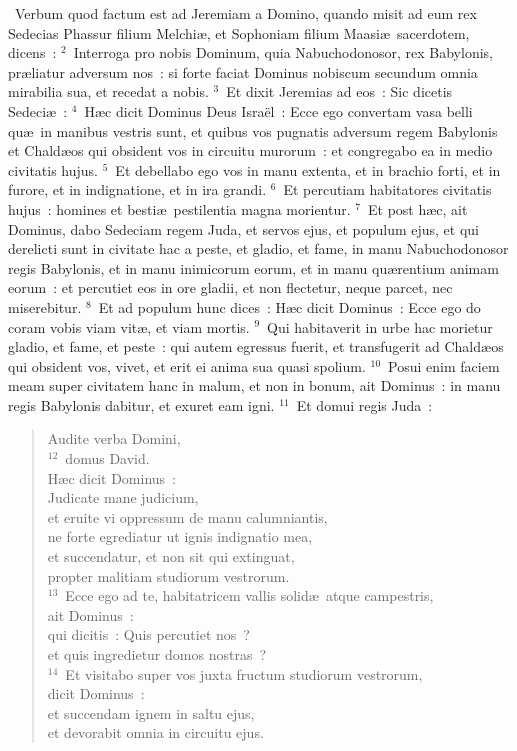~Verbum quod factum est ad Jeremiam a Domino, quando misit ad eum rex Sedecias Phassur filium Melchi\ae , et Sophoniam filium Maasi\ae\ sacerdotem, dicens~:
${}^{2}$~Interroga pro nobis Dominum, quia Nabuchodonosor, rex Babylonis, pr\ae liatur adversum nos~: si forte faciat Dominus nobiscum secundum omnia mirabilia sua, et recedat a nobis.
${}^{3}$~Et dixit Jeremias ad eos~: Sic dicetis Sedeci\ae~:
${}^{4}$~H\ae c dicit Dominus Deus Isra\"el~: Ecce ego convertam vasa belli qu\ae\ in manibus vestris sunt, et quibus vos pugnatis adversum regem Babylonis et Chald\ae os qui obsident vos in circuitu murorum~: et congregabo ea in medio civitatis hujus.
${}^{5}$~Et debellabo ego vos in manu extenta, et in brachio forti, et in furore, et in indignatione, et in ira grandi.
${}^{6}$~Et percutiam habitatores civitatis hujus~: homines et besti\ae\ pestilentia magna morientur.
${}^{7}$~Et post h\ae c, ait Dominus, dabo Sedeciam regem Juda, et servos ejus, et populum ejus, et qui derelicti sunt in civitate hac a peste, et gladio, et fame, in manu Nabuchodonosor regis Babylonis, et in manu inimicorum eorum, et in manu qu\ae rentium animam eorum~: et percutiet eos in ore gladii, et non flectetur, neque parcet, nec miserebitur.
${}^{8}$~Et ad populum hunc dices~: H\ae c dicit Dominus~: Ecce ego do coram vobis viam vit\ae , et viam mortis.
${}^{9}$~Qui habitaverit in urbe hac morietur gladio, et fame, et peste~: qui autem egressus fuerit, et transfugerit ad Chald\ae os qui obsident vos, vivet, et erit ei anima sua quasi spolium.
${}^{10}$~Posui enim faciem meam super civitatem hanc in malum, et non in bonum, ait Dominus~: in manu regis Babylonis dabitur, et exuret eam igni.
${}^{11}$~Et domui regis Juda~: \begin{flushleft}\begin{verse}Audite verba Domini,\\
${}^{12}$~domus David.\\ H\ae c dicit Dominus~:\\ Judicate mane judicium,\\ et eruite vi oppressum de manu calumniantis,\\ ne forte egrediatur ut ignis indignatio mea,\\ et succendatur, et non sit qui extinguat,\\ propter malitiam studiorum vestrorum.\\
${}^{13}$~Ecce ego ad te, habitatricem vallis solid\ae\ atque campestris,\\ ait Dominus~:\\ qui dicitis~: Quis percutiet nos~?\\ et quis ingredietur domos nostras~?\\
${}^{14}$~Et visitabo super vos juxta fructum studiorum vestrorum,\\ dicit Dominus~:\\ et succendam ignem in saltu ejus,\\ et devorabit omnia in circuitu ejus.\end{verse}\end{flushleft}


